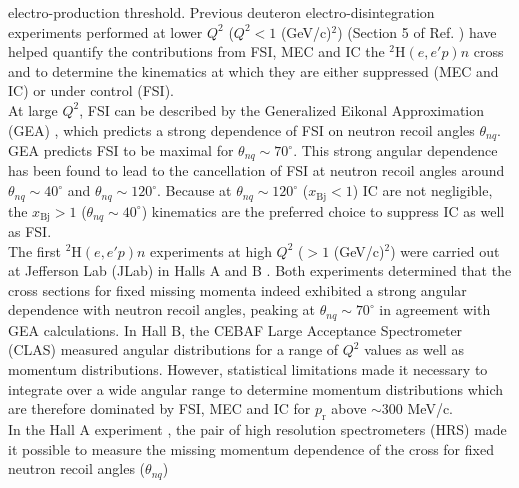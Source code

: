 electro-production threshold. Previous deuteron electro-disintegration experiments performed at lower $Q^{2}$ ($Q^{2}<1$ (GeV/c)$^{2}$) (\DIFdelbegin {}\DIFdelend \DIFaddbegin {}\DIFaddend Section 5 of Ref. \cite{sargsian_2015}) have helped quantify the contributions
from FSI, MEC and IC \DIFdelbegin {}\DIFdelend \DIFaddbegin {}\DIFaddend the $^{2}\mathrm{H}(e,e'p)n$ cross \DIFdelbegin {}\DIFdelend \DIFaddbegin {}\DIFaddend and to determine the kinematics at which they are either suppressed (MEC and IC) or under control (FSI).  \\
\indent At large $Q^{2}$, FSI can be described by the Generalized Eikonal Approximation (GEA) \cite{Sargsian_2001,PhysRevC.56.1124,sargsian_2015}, which predicts a strong dependence of FSI on neutron recoil angles $\theta_{nq}$.
GEA predicts FSI to be maximal for $\theta_{nq}\sim70^{\circ}$. This strong angular dependence has been found to lead to the cancellation of FSI at neutron recoil angles around $\theta_{nq}\sim40^{\circ}$ and $\theta_{nq}\sim120^{\circ}$. Because at
$\theta_{nq}\sim120^{\circ}$ ($x_{\mathrm{Bj}}<1$) IC are not negligible, the $x_{\mathrm{Bj}}>1$ ($\theta_{nq}\sim40^{\circ}$) kinematics are the preferred choice to suppress IC as well as FSI. \\
\indent The first $^{2}\mathrm{H}(e,e'p)n$ experiments at high $Q^{2}$ ($>1$ (GeV/c)$^{2}$) were carried out at Jefferson Lab (JLab) in Halls A \cite{PhysRevLett.107.262501} and B \cite{PhysRevLett.98.262502}. Both
experiments determined that the cross sections for fixed missing momenta indeed exhibited a strong angular dependence with neutron recoil angles, peaking
at $\theta_{nq} \sim 70^{\circ}$ in agreement with GEA \cite{Sargsian_2001,PhysRevC.56.1124} calculations. In Hall B, the CEBAF Large Acceptance Spectrometer (CLAS) measured angular
distributions for  a range of $Q^2$ values as well as momentum distributions. However, statistical limitations made it necessary to integrate over a wide angular range to determine momentum distributions
which are therefore dominated by  FSI, MEC and IC for $p_{\mathrm{r}}$ above $\sim 300$ MeV/c. \\
\indent In the Hall A experiment \cite{PhysRevLett.107.262501}, the pair of high resolution spectrometers (HRS) made it possible to measure the missing momentum dependence of the cross \DIFdelbegin {}\DIFdelend \DIFaddbegin {}\DIFaddend for fixed neutron recoil angles ($\theta_{nq}$)
